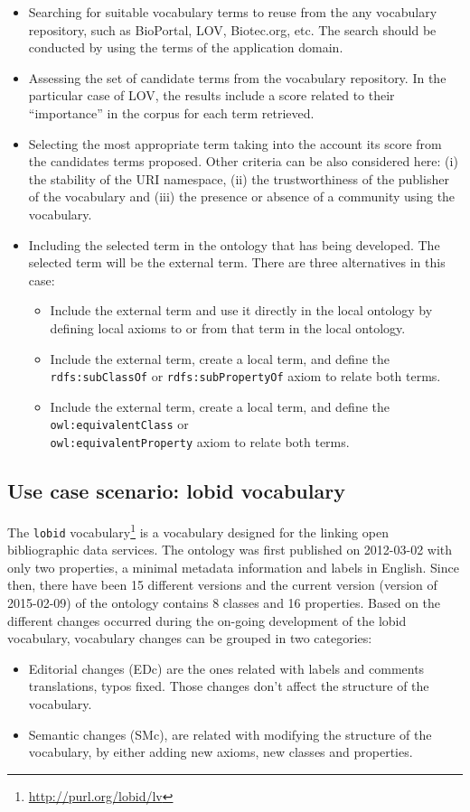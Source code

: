 \begin{itemize}
	\item Searching for suitable vocabulary terms to reuse from the any vocabulary repository, such as BioPortal, LOV, Biotec.org, etc. The search should be conducted by using the terms of the application domain.
	\item Assessing the set of candidate terms from the vocabulary repository. In the particular case of LOV, the results include a score related to their ``importance'' in the corpus for each term retrieved.
	\item Selecting the most appropriate term taking into the account its score from the candidates terms proposed. Other criteria can be also considered here: (i) the stability of the URI namespace, (ii) the trustworthiness of the publisher of the vocabulary and (iii) the presence or absence of a community using the vocabulary.
	\item Including the selected term in the ontology that has being developed. The selected term will be the external term. There are three alternatives in this case: 
	\begin{itemize}
		\item Include the external term and use it directly in the local ontology by defining local axioms to or from that term in the local ontology.
		\item Include the external term, create a local term, and define the {\tt rdfs:subClassOf} or {\tt rdfs:subPropertyOf} axiom to relate both terms.
		\item Include the external term, create a local term, and define the {\tt owl:equivalentClass} or \\ {\tt owl:equivalentProperty} axiom to relate both terms. 				
	\end{itemize}
\end{itemize}

\subsection{Use case scenario: lobid vocabulary}
\label{lobid vocabulary}
The \texttt{lobid} vocabulary\footnote{\url{http://purl.org/lobid/lv}} is a vocabulary designed for the  linking open bibliographic data services. The ontology was first published on 2012-03-02 with only two properties, a minimal metadata information and labels in English. Since then, there have been 15 different versions and the current version (version of 2015-02-09) of the ontology contains 8 classes and 16 properties. Based on the different changes occurred during the on-going development of the lobid vocabulary, vocabulary changes can be grouped in two categories:
\begin{itemize}
\item Editorial changes (EDc) are the ones related with labels and comments translations, typos fixed. Those changes don't affect the structure of the vocabulary.
\item Semantic changes (SMc), are related with modifying the structure of the vocabulary, by either adding new axioms, new classes and properties.
\end{itemize}

